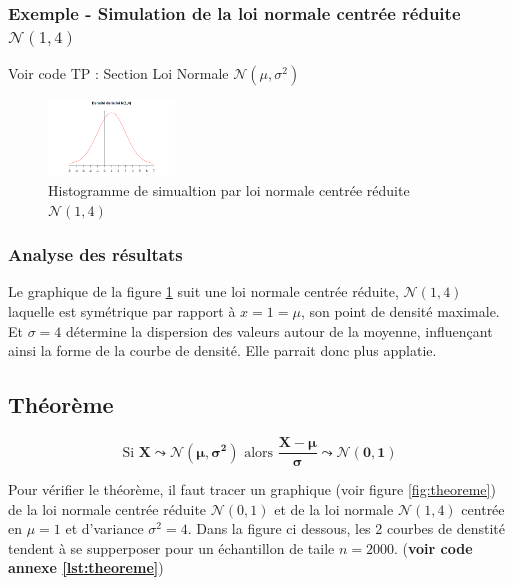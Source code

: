         \subsubsection{Exemple - Simulation de la loi normale centrée réduite $\mathcal N(1,4)$}
        Voir code TP : Section Loi Normale $\mathcal{N}(\mu,\sigma^2)$ \cite{TP}
        \begin{figure}[H]
            \centering
            \includegraphics[width=0.3\textwidth]{4_attachments/figures/output12.png}
            \caption{Histogramme de simualtion par loi normale centrée réduite $\mathcal N(1,4)$}
            \label{fig:histogramme_uniforme_ab}
        \end{figure}

        \subsubsection{Analyse des résultats}
            Le graphique de la figure \ref{fig:histogramme_uniforme_ab} suit une loi normale centrée réduite, $\mathcal N(1,4)$ laquelle est symétrique par rapport à $x=1=\mu$, son point de densité maximale. 
            Et $\sigma = 4$ détermine la dispersion des valeurs autour de la moyenne, influençant ainsi la forme de la courbe de densité. Elle parrait donc plus applatie.
        \subsection{Théorème}
            \begin{equation}
                \text{Si } \mathbf{X\leadsto\mathcal N(\mu,\sigma^2)} \text{ alors } \mathbf{\dfrac{X-\mu}\sigma\leadsto\mathcal N(0,1)}
            \end{equation}

            Pour vérifier le théorème, il faut tracer un graphique (voir figure \ref{fig:theoreme}) de la loi normale centrée réduite $\mathcal N(0,1)$ et de la loi normale $\mathcal N(1,4)$ centrée en $\mu=1$ et d'variance $\sigma^2=4$.
            Dans la figure ci dessous, les 2 courbes de denstité tendent à se supperposer pour un échantillon de taile $n=2000$. (\textbf{voir code annexe \ref{lst:theoreme}})

